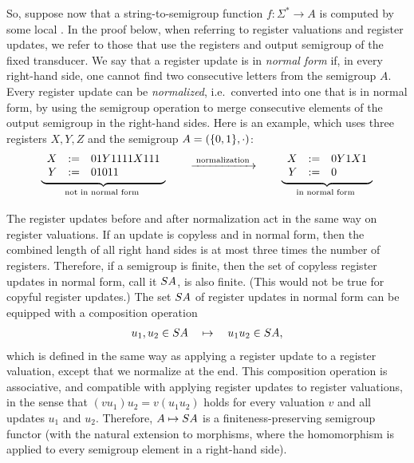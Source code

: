 So, suppose now that a string-to-semigroup function $f\colon \Sigma^* \to A$ is
computed by some local \sst. In the proof below, when referring to register valuations and register updates, we refer to those that use the registers and output semigroup of the fixed transducer. We say that a register update is in \emph{normal form} if, in every right-hand side, one cannot find two consecutive letters from the semigroup $A$.
Every register update can be \emph{normalized}, i.e.~converted into one that is in normal form, by using the semigroup operation to merge consecutive elements of the output semigroup in the right-hand sides.
Here is an example, which uses three registers $X,Y,Z$ and the semigroup $A = (\{0,1\}, \cdot)$:
\begin{align*}
\myunderbrace{
\begin{array}{rcl}
    X &:=& 01Y1111X111\\
Y &:=& 01011
\end{array}
}{not in normal form}
\qquad \xrightarrow{\;\text{normalization}\;} \qquad
\myunderbrace{
\begin{array}{rcl}
    X &:=& 0Y1X1\\
Y &:=& 0
\end{array}
}{in normal form}
\end{align*}

 The  register updates before and after normalization act in the same way on register valuations.   If an update is copyless and in normal form, then the combined length of all right hand sides is at most three times the number of registers. Therefore, if a semigroup is finite, then the set of copyless register updates in normal form, call it $\functors A$,  is also finite. (This would not be true for copyful register updates.) The set $\functors A$ of register updates in normal form can be equipped with a composition operation 
\begin{align*}
    u_1,u_2 \in \functors A  \quad \mapsto \quad u_1u_2 \in \functors A,
\end{align*}
which is defined in the same way as applying a register update to a register
valuation, except that we normalize at the end. This composition operation is
associative, and  compatible with applying register updates to register
valuations, in the sense that $(vu_1)u_2 = v(u_1u_2)$ holds for every valuation
$v$ and all updates $u_1$ and $u_2$. Therefore, $A \mapsto \functors A$ is a finiteness-preserving semigroup functor (with the natural extension to morphisms, where the homomorphism is applied to every semigroup element in a right-hand side). 

